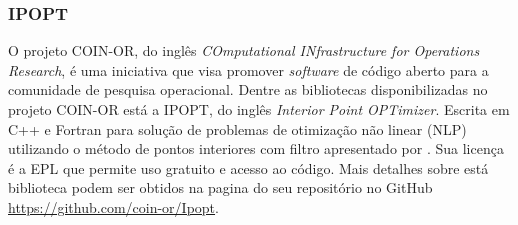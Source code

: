 \subsubsection{IPOPT}

O projeto COIN-OR, do inglês \textit{COmputational INfrastructure for Operations Research},
 é uma iniciativa que visa promover \textit{software} de código aberto para a comunidade de pesquisa operacional. \cite{article:CoinOr} 
 Dentre as bibliotecas disponibilizadas no projeto COIN-OR está a IPOPT, do inglês \textit{Interior Point OPTimizer}.
 Escrita em C++ e Fortran para solução de problemas de otimização não linear (NLP) utilizando o
 método de pontos interiores com filtro apresentado por . Sua licença é a EPL que permite uso gratuito e acesso ao código. Mais detalhes sobre está biblioteca podem ser obtidos na pagina do seu repositório no GitHub  \url{https://github.com/coin-or/Ipopt}.

\clearpage